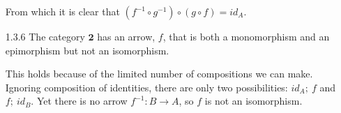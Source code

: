 \documentclass{article}
\begin{document}
\begin{enumerate}
  From which it is clear that $(f^{-1} \circ g^{-1}) \circ (g \circ f) = id_A$.

\item[]
\item[1.3.6] The category $\textbf{2}$ has an arrow, $f$, that is both a monomorphism and an epimorphism but not an isomorphism. 
  \begin{center}
  \end{center}
  This holds because of the limited number of compositions we can make. 
  Ignoring composition of identities, there are only two possibilities: $id_A;\ f$ and $f;\ id_B$. 
  Yet there is no arrow $f^{-1}: B \rightarrow A$, so $f$ is not an isomorphism.
\end{enumerate}
\end{document}
